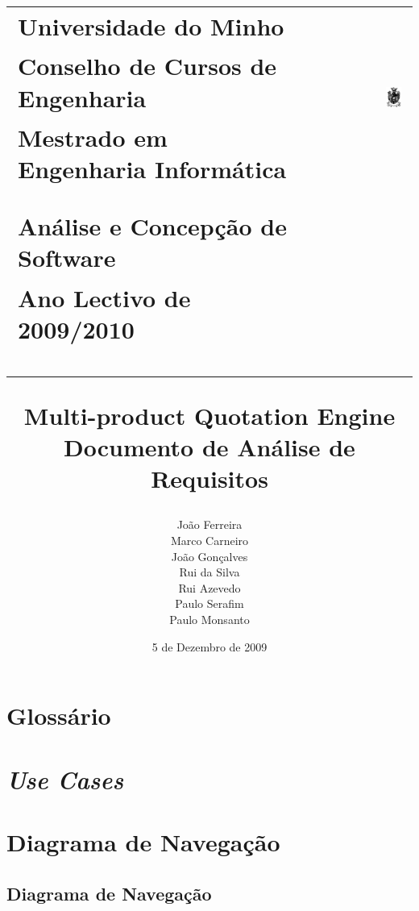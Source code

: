 \documentclass[pdftex,12pt,a4paper]{report}
\title{	
	\begin{tabular}{l r}
	\large{Universidade do Minho} & \multirow{3}{*}{\includegraphics[width=0.2\textwidth]{images/UM}} \\
	\large{Conselho de Cursos de Engenharia} & \\
	\large{Mestrado em Engenharia Informática} & \\
	\\
	\\
	\Large{\textbf{Análise e Concepção de Software}} & \\
	\large{Ano Lectivo de 2009/2010} & \\
	\\
	\\
	\\
	\end{tabular}
	\textbf{Multi-product Quotation Engine\\Documento de Análise de Requisitos}
}
\author{João Ferreira\\Marco Carneiro\\João Gonçalves\\Rui da Silva\\Rui Azevedo\\Paulo Serafim\\Paulo Monsanto}
\date{5 de Dezembro de 2009}
\begin{document}
\maketitle
\tableofcontents










\appendix
\chapter{Glossário}


\chapter{\emph{Use Cases}}

\chapter{Diagrama de Navegação}
\section{Diagrama de Navegação}

\end{document}
